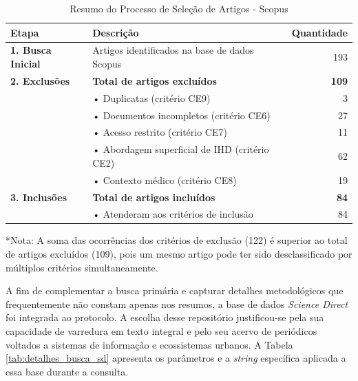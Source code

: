 \documentclass[
	12pt,				%
	oneside,			%
	a4paper,			%
	english,			%
	brazil				%
	]{abntex2ppgsi}
\begin{document}
\begin{table}[h]
\centering
\caption{Resumo do Processo de Seleção de Artigos - Scopus}
\label{tab:resumo_selecao_Scopus}
\begin{tabularx}{\textwidth}{lXr}
\toprule
\textbf{Etapa} & \textbf{Descrição} & \textbf{Quantidade} \\
\midrule
\textbf{1. Busca Inicial} & Artigos identificados na base de dados Scopus & 193 \\
\midrule
\textbf{2. Exclusões} & \textbf{Total de artigos excluídos} & \textbf{109} \\
& \hspace{0.5cm}• Duplicatas (critério CE9) & 3 \\
& \hspace{0.5cm}• Documentos incompletos (critério CE6) & 27 \\
& \hspace{0.5cm}• Acesso restrito (critério CE7) & 11 \\
& \hspace{0.5cm}• Abordagem superficial de IHD (critério CE2) & 62 \\
& \hspace{0.5cm}• Contexto médico (critério CE8) & 19 \\
\midrule
\textbf{3. Inclusões} & \textbf{Total de artigos incluídos} & \textbf{84} \\
& \hspace{0.5cm}• Atenderam aos critérios de inclusão & 84 \\
\bottomrule
\end{tabularx}
\vspace{0.2cm}
\footnotesize{*Nota: A soma das ocorrências dos critérios de exclusão (122) é superior ao total de artigos excluídos (109), pois um mesmo artigo pode ter sido desclassificado por múltiplos critérios simultaneamente.}
\end{table}

    A fim de complementar a busca primária e capturar detalhes metodológicos que frequentemente não constam apenas nos resumos, a base de dados \textit{Science Direct} foi integrada ao protocolo. A escolha desse repositório justificou-se pela sua capacidade de varredura em texto integral e pelo seu acervo de periódicos voltados a sistemas de informação e ecossistemas urbanos. A Tabela \ref{tab:detalhes_busca_sd} apresenta os parâmetros e a \textit{string} específica aplicada a essa base durante a consulta.
\end{document}
